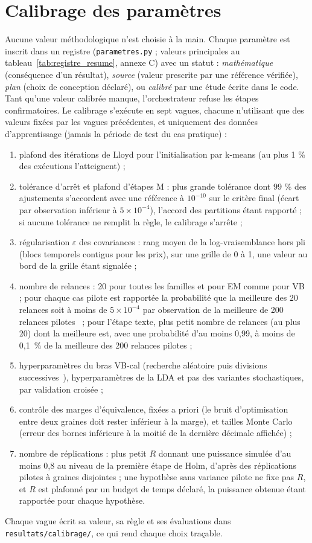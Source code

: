 \section{Calibrage des paramètres}\label{sec:calibrage}
Aucune valeur méthodologique n'est choisie à la main. Chaque paramètre est inscrit dans un registre (\texttt{parametres.py} ; valeurs principales au tableau~\ref{tab:registre_resume}, annexe C) avec un statut : \emph{mathématique} (conséquence d'un résultat), \emph{source} (valeur prescrite par une référence vérifiée), \emph{plan} (choix de conception déclaré), ou \emph{calibré} par une étude écrite dans le code. Tant qu'une valeur calibrée manque, l'orchestrateur refuse les étapes confirmatoires. Le calibrage s'exécute en sept vagues, chacune n'utilisant que des valeurs fixées par les vagues précédentes, et uniquement des données d'apprentissage (jamais la période de test du cas pratique) :
\begin{enumerate}
\item plafond des itérations de Lloyd pour l'initialisation par k-means (au plus 1 \% des exécutions l'atteignent) ;
\item tolérance d'arrêt et plafond d'étapes M : plus grande tolérance dont 99 \% des ajustements s'accordent avec une référence à $10^{-10}$ sur le critère final (écart par observation inférieur à $5 \times 10^{-4}$), l'accord des partitions étant rapporté ; si aucune tolérance ne remplit la règle, le calibrage s'arrête ;
\item régularisation $\varepsilon$ des covariances : rang moyen de la log-vraisemblance hors pli (blocs temporels contigus pour les prix), sur une grille de 0 à 1, une valeur au bord de la grille étant signalée ;
\item nombre de relances : 20 pour toutes les familles et pour EM comme pour VB ; pour chaque cas pilote est rapportée la probabilité que la meilleure des 20 relances soit à moins de $5 \times 10^{-4}$ par observation de la meilleure de 200 relances pilotes~\cite{biernacki2003} ; pour l'étape texte, plus petit nombre de relances (au plus 20) dont la meilleure est, avec une probabilité d'au moins 0,99, à moins de 0,1~\% de la meilleure des 200 relances pilotes ;
\item hyperparamètres du bras VB-cal (recherche aléatoire puis divisions successives~\cite{bergstra2012,jamieson2016}), hyperparamètres de la LDA et pas des variantes stochastiques, par validation croisée ;
\item contrôle des marges d'équivalence, fixées a priori (le bruit d'optimisation entre deux graines doit rester inférieur à la marge), et tailles Monte Carlo (erreur des bornes inférieure à la moitié de la dernière décimale affichée) ;
\item nombre de réplications : plus petit $R$ donnant une puissance simulée d'au moins 0,8 au niveau de la première étape de Holm, d'après des réplications pilotes à graines disjointes ; une hypothèse sans variance pilote ne fixe pas $R$, et $R$ est plafonné par un budget de temps déclaré, la puissance obtenue étant rapportée pour chaque hypothèse.
\end{enumerate}
Chaque vague écrit sa valeur, sa règle et ses évaluations dans \texttt{resultats/calibrage/}, ce qui rend chaque choix traçable.


